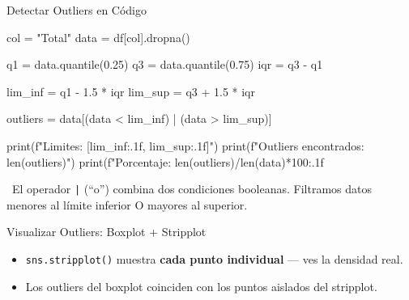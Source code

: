 \documentclass[aspectratio=169, 11pt]{beamer}
\begin{document}
\begin{frame}[fragile,shrink=28]{Detectar Outliers en Código}
  \vspace{-6pt}
  \begin{pyblock}
col = "Total"
data = df[col].dropna()

q1 = data.quantile(0.25)
q3 = data.quantile(0.75)
iqr = q3 - q1

lim_inf = q1 - 1.5 * iqr
lim_sup = q3 + 1.5 * iqr

outliers = data[(data < lim_inf) | (data > lim_sup)]

print(f"Limites: [{lim_inf:.1f}, {lim_sup:.1f}]")
print(f"Outliers encontrados: {len(outliers)}")
print(f"Porcentaje: {len(outliers)/len(data)*100:.1f}%
  \end{pyblock}

  \vspace{4pt}
  {\scriptsize\color{textMuted}
    \faLightbulb\ El operador \texttt{|} (``o'') combina dos condiciones booleanas.
    Filtramos datos menores al límite inferior O mayores al superior.}
\end{frame}

\begin{frame}[fragile,shrink=28]{Visualizar Outliers: Boxplot + Stripplot}
  \vspace{-6pt}

  \vspace{4pt}
  {\scriptsize\color{textMuted}
  \begin{itemize}\setlength{\itemsep}{3pt}
    \item[{\color{arcaRed}\scriptsize\faArrowRight}]
      \texttt{sns.stripplot()} muestra \textbf{cada punto individual} --- ves la densidad real.
    \item[{\color{arcaRed}\scriptsize\faArrowRight}]
      Los outliers del boxplot coinciden con los puntos aislados del stripplot.
  \end{itemize}
  }
\end{frame}
\end{document}
